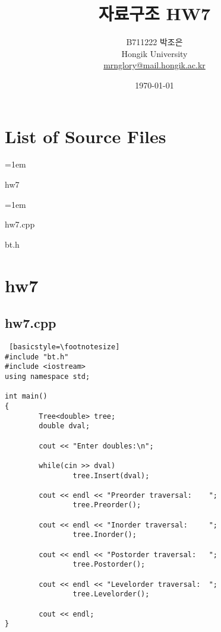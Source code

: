 \documentclass[twoside,twocolumn]{article}
\title{자료구조 HW7} %
\author{%
\normalsize B711222 \textsc{박조은} \\ %
\normalsize Hongik University \\ %
\normalsize \href{mailto:mrnglory@mail.hongik.ac.kr}{mrnglory@mail.hongik.ac.kr} %
}
\date{\today} %
\newenvironment{itemizeReduced}{
\begin{list}{\labelitemi}{\leftmargin=1em}
\setlength{\itemsep}{1pt}
\setlength{\parskip}{0pt}
\setlength{\parsep}{0pt}}{\end{list}
}
\begin{document}
\maketitle


\section{List of Source Files}
\begin{itemizeReduced}
\item hw7
\begin{itemizeReduced}
    \item hw7.cpp
    \item bt.h
    \end{itemizeReduced}
\end{itemizeReduced}

\section{hw7}

\subsection{hw7.cpp}
\begin{lstlisting} [basicstyle=\footnotesize]
#include "bt.h"
#include <iostream>
using namespace std;

int main()
{
        Tree<double> tree;
        double dval;

        cout << "Enter doubles:\n";

        while(cin >> dval)
                tree.Insert(dval);

        cout << endl << "Preorder traversal:    ";
                tree.Preorder();

        cout << endl << "Inorder traversal:     ";
                tree.Inorder();

        cout << endl << "Postorder traversal:   ";
                tree.Postorder();

        cout << endl << "Levelorder traversal:  ";
                tree.Levelorder();

        cout << endl;
}
\end{lstlisting}
\end{document}
